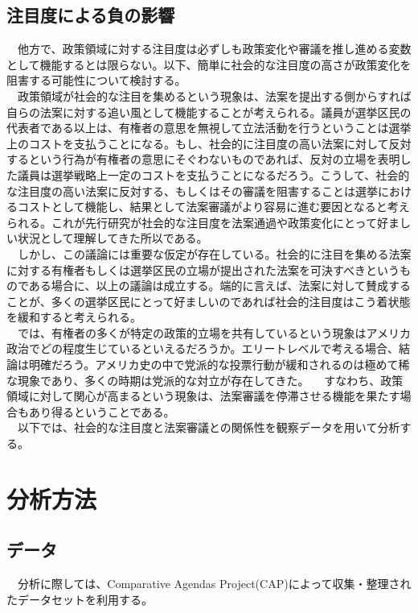 \documentclass[here]{article}
\begin{document}
\subsection{注目度による負の影響}
　他方で、政策領域に対する注目度は必ずしも政策変化や審議を推し進める変数として機能するとは限らない。以下、簡単に社会的な注目度の高さが政策変化を阻害する可能性について検討する。\\
　政策領域が社会的な注目を集めるという現象は、法案を提出する側からすれば自らの法案に対する追い風として機能することが考えられる。議員が選挙区民の代表者である以上は、有権者の意思を無視して立法活動を行うということは選挙上のコストを支払うことになる。もし、社会的に注目度の高い法案に対して反対するという行為が有権者の意思にそぐわないものであれば、反対の立場を表明した議員は選挙戦略上一定のコストを支払うことになるだろう。こうして、社会的な注目度の高い法案に反対する、もしくはその審議を阻害することは選挙におけるコストとして機能し、結果として法案審議がより容易に進む要因となると考えられる。これが先行研究が社会的な注目度を法案通過や政策変化にとって好ましい状況として理解してきた所以である。\\
　しかし、この議論には重要な仮定が存在している。社会的に注目を集める法案に対する有権者もしくは選挙区民の立場が提出された法案を可決すべきというものである場合に、以上の議論は成立する。端的に言えば、法案に対して賛成することが、多くの選挙区民にとって好ましいのであれば社会的注目度はこう着状態を緩和すると考えられる。\\
　では、有権者の多くが特定の政策的立場を共有しているという現象はアメリカ政治でどの程度生じているといえるだろうか。エリートレベルで考える場合、結論は明確だろう。アメリカ史の中で党派的な投票行動が緩和されるのは極めて稀な現象であり、多くの時期は党派的な対立が存在してきた。\citep*{Poole2007-ir,}
　すなわち、政策領域に対して関心が高まるという現象は、法案審議を停滞させる機能を果たす場合もあり得るということである。\\
　以下では、社会的な注目度と法案審議との関係性を観察データを用いて分析する。\\

\section{分析方法}
\subsection{データ}
　分析に際しては、Comparative Agendas Project(CAP)によって収集・整理されたデータセットを利用する。\\
\end{document}
